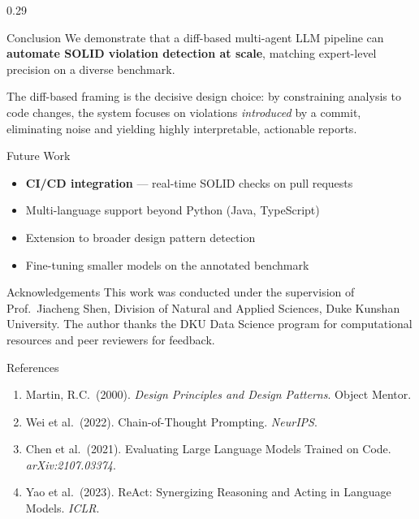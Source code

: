 \documentclass[10pt,final]{beamer}
\begin{document}
\begin{frame}[t]
\begin{columns}[T]
\begin{column}{0.29\paperwidth}
      \begin{block}{Conclusion}
        We demonstrate that a diff-based multi-agent LLM pipeline can
        \textbf{automate SOLID violation detection at scale}, matching expert-level
        precision on a diverse benchmark.

        \vspace{0.3cm}
        The diff-based framing is the decisive design choice: by constraining
        analysis to code changes, the system focuses on violations
        \emph{introduced} by a commit, eliminating noise and yielding
        highly interpretable, actionable reports.
      \end{block}

      \begin{block}{Future Work}
        \begin{itemize}
          \item \textbf{CI/CD integration} — real-time SOLID checks on pull requests
          \item Multi-language support beyond Python (Java, TypeScript)
          \item Extension to broader design pattern detection
          \item Fine-tuning smaller models on the annotated benchmark
        \end{itemize}
      \end{block}

      \begin{block}{Acknowledgements}
        This work was conducted under the supervision of Prof.\ Jiacheng Shen,
        Division of Natural and Applied Sciences, Duke Kunshan University.
        The author thanks the DKU Data Science program for computational
        resources and peer reviewers for feedback.
      \end{block}

      \begin{block}{References}
        {\fontsize{22}{27}\selectfont
        \begin{enumerate}
          \item Martin, R.C.\ (2000). \textit{Design Principles and Design Patterns}.
            Object Mentor.
          \item Wei et al.\ (2022). Chain-of-Thought Prompting. \textit{NeurIPS}.
          \item Chen et al.\ (2021). Evaluating Large Language Models Trained
            on Code. \textit{arXiv:2107.03374}.
          \item Yao et al.\ (2023). ReAct: Synergizing Reasoning and Acting
            in Language Models. \textit{ICLR}.
        \end{enumerate}
        }
      \end{block}

    \end{column}

    \hspace{1.2cm}
  \end{columns}

\end{frame}
\end{document}
